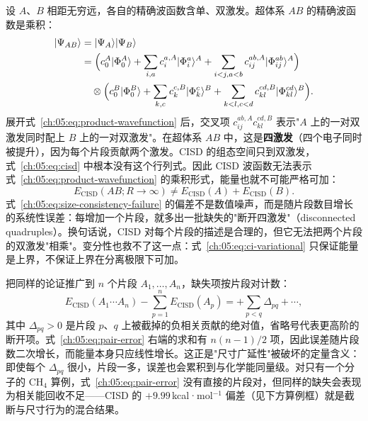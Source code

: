设 $A$、$B$ 相距无穷远，各自的精确波函数含单、双激发。超体系 $AB$ 的精确波函数是乘积：
\begin{equation}
\begin{split}
\lvert \Psi_{AB}\rangle
&= \lvert \Psi_A\rangle\lvert \Psi_B\rangle\\
&= \Big(c_0^A\lvert \Phi_0^A\rangle
  + \sum_{i,a} c_i^{a,A}\lvert \Phi_i^a\rangle^A
  + \sum_{i<j,a<b} c_{ij}^{ab,A}\lvert \Phi_{ij}^{ab}\rangle^A\Big)\\
&\quad\otimes
\Big(c_0^B\lvert \Phi_0^B\rangle
  + \sum_{k,c} c_k^{c,B}\lvert \Phi_k^c\rangle^B
  + \sum_{k<l,c<d} c_{kl}^{cd,B}\lvert \Phi_{kl}^{cd}\rangle^B\Big).
\end{split}
\label{ch:05:eq:product-wavefunction}
\end{equation}
展开式~\eqref{ch:05:eq:product-wavefunction} 后，交叉项 $c_{ij}^{ab,A}c_{kl}^{cd,B}$ 表示"$A$ 上的一对双激发同时配上 $B$ 上的一对双激发"。在超体系 $AB$ 中，这是\textbf{四激发}（四个电子同时被提升），因为每个片段贡献两个激发。CISD 的组态空间只到双激发，式~\eqref{ch:05:eq:cisd} 中根本没有这个行列式。因此 CISD 波函数无法表示式~\eqref{ch:05:eq:product-wavefunction} 的乘积形式，能量也就不可能严格可加：
\begin{equation}
E_{\mathrm{CISD}}(AB;R\to\infty)
\ne E_{\mathrm{CISD}}(A)+E_{\mathrm{CISD}}(B).
\label{ch:05:eq:size-consistency-failure}
\end{equation}
式~\eqref{ch:05:eq:size-consistency-failure} 的偏差不是数值噪声，而是随片段数目增长的系统性误差：每增加一个片段，就多出一批缺失的"断开四激发"（disconnected quadruples）。换句话说，CISD 对每个片段的描述是合理的，但它无法把两个片段的双激发"相乘"。变分性也救不了这一点：式~\eqref{ch:05:eq:ci-variational} 只保证能量是上界，不保证上界在分离极限下可加。

把同样的论证推广到 $n$ 个片段 $A_1,\ldots,A_n$，缺失项按片段对计数：
\begin{equation}
E_{\mathrm{CISD}}(A_1\cdots A_n)
- \sum_{p=1}^{n}E_{\mathrm{CISD}}(A_p)
= +\sum_{p<q}\Delta_{pq}+\cdots,
\label{ch:05:eq:pair-error}
\end{equation}
其中 $\Delta_{pq}>0$ 是片段 $p$、$q$ 上被截掉的负相关贡献的绝对值，省略号代表更高阶的断开项。式~\eqref{ch:05:eq:pair-error} 右端的求和有 $n(n-1)/2$ 项，因此误差随片段数二次增长，而能量本身只应线性增长。这正是"尺寸广延性"被破坏的定量含义：即使每个 $\Delta_{pq}$ 很小，片段一多，误差也会累积到与化学能同量级。对只有一个分子的 CH$_4$ 算例，式~\eqref{ch:05:eq:pair-error} 没有直接的片段对，但同样的缺失会表现为相关能回收不足——CISD 的 $+9.99$\,kcal·mol$^{-1}$ 偏差（见下方算例框）就是截断与尺寸行为的混合结果。

